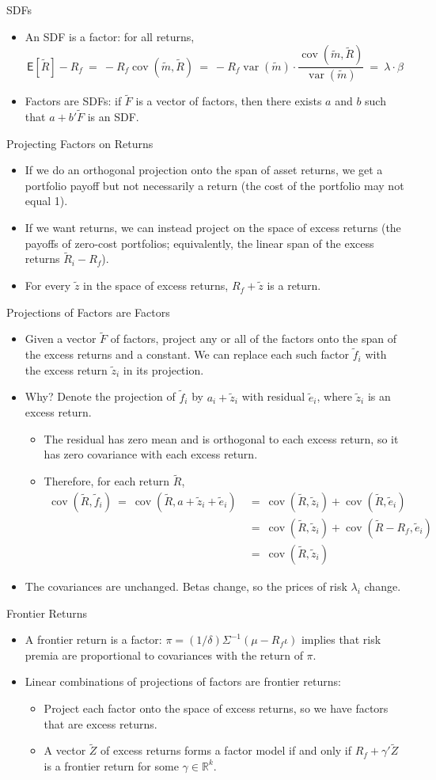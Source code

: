\documentclass[10pt]{beamer}
\DeclareMathOperator{\var}{var}
\DeclareMathOperator{\cov}{cov}
\newcommand{\bi}{\begin{itemize}}
\newcommand{\ei}{\end{itemize}}
\newcommand{\im}{\item}
\newcommand{\mye}{\ensuremath{\mathsf{E}}}
\newcommand{\myreal}{\ensuremath{\mathbb{R}}}
\newcommand{\te}{\tilde{e}}
\newcommand{\tF}{\tilde{F}}
\newcommand{\tf}{\tilde{f}}
\newcommand{\tZ}{\tilde{Z}}
\newcommand{\tm}{\tilde{m}}
\newcommand{\tz}{\tilde{z}}
\newcommand{\tr}{\widetilde{R}}
\begin{document}
\begin{frame}{SDFs}
    \bi 
    \im An SDF is a factor: for all returns,
$$\mye[\tr]-R_f \ = \ -R_f\cov(\tm,\tr) \ = \ -R_f \var(\tm) \cdot \frac{\cov(\tm,\tr)}{\var(\tm)} \ = \ \lambda \cdot \beta$$

\im Factors are SDFs: if $\tF$ is a vector of factors, then there exists $a$ and $b$ such that $a+b'\tF$ is an SDF.
\ei 
\end{frame}

\begin{frame}{Projecting Factors on Returns}
    \bi 
    \im If we do an orthogonal projection onto the span of asset returns, we get a portfolio payoff but not necessarily a return (the cost of the portfolio may not equal 1).

    \im If we want returns, we can instead project on the space of excess returns (the payoffs of zero-cost portfolios; equivalently, the linear span of the excess returns $\tr_i-R_f$).  

    \im For every $\tz$ in the space of excess returns, $R_f + \tz$ is a return.
\ei 
\end{frame}

\begin{frame}{Projections of Factors are Factors}
\bi 
\im Given a vector $\tF$ of factors, project any or all of the factors onto the span of the excess returns and a constant.  We can replace each such factor $\tf_i$ with the excess return $\tz_i$ in its projection.  

\im Why?  Denote the projection of $\tf_i$ by $a_i + \tz_i$ with residual $\te_i$, where $\tz_i$ is an excess return.  
  \bi 
  \im The residual has zero mean and is orthogonal to each excess return, so it has zero covariance with each excess return.  \im Therefore, for each return $\tr$,  
\begin{align*}
\cov(\tr,\tf_i) \ = \ \cov(\tr,a+ \tz_i + \te_i) \ &= \ \cov(\tr,\tz_i) + \cov(\tr,\te_i)\\
&= \ \cov(\tr,\tz_i) + \cov(\tr-R_f,\te_i)\\
&   = \ \cov(\tr,\tz_i)
\end{align*}
\ei 
\im The covariances are unchanged.  Betas change, so the prices of risk $\lambda_i$ change.
\ei 
\end{frame}

\begin{frame}{Frontier Returns}
    \bi 
    \im A frontier return is a factor: $\pi = (1/\delta)\Sigma^{-1}(\mu - R_f\iota)$ implies that risk premia are proportional to covariances with the return of $\pi$.

    \im Linear combinations of projections of factors are frontier returns: 
    \bi 
    \im Project each factor onto the space of excess returns, so we have factors  that are excess returns.  
    \im A vector $\tZ$ of excess returns forms a factor model if and only if $R_f + \gamma'\tZ$ is a frontier return for some $\gamma \in \myreal^k$.  
    \ei
\ei 
\end{frame}
\end{document}
